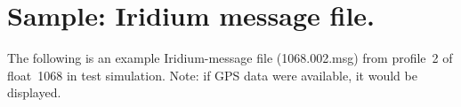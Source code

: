 %
%
%
%
%
%

\section{Sample: Iridium message file.}
\label{sec:IridiumMsgSample}
\renewcommand{\theequation}{\Alph{section}.\arabic{equation}}

The following is an example Iridium-message file (1068.002.msg) from
profile~2 of float~1068 in test simulation.  Note: if GPS data were available,
it would be displayed.


